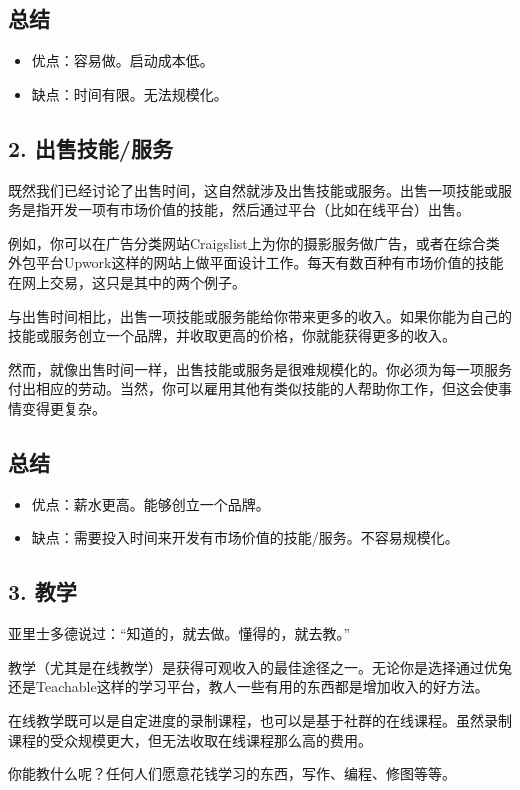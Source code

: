 \subsection{总结}
\begin{itemize}
\item 优点：容易做。启动成本低。
\item 缺点：时间有限。无法规模化。
\end{itemize}
\subsection{2. 出售技能/服务}
既然我们已经讨论了出售时间，这自然就涉及出售技能或服务。出售一项技能或服务是指开发一项有市场价值的技能，然后通过平台（比如在线平台）出售。

例如，你可以在广告分类网站Craigslist上为你的摄影服务做广告，或者在综合类外包平台Upwork这样的网站上做平面设计工作。每天有数百种有市场价值的技能在网上交易，这只是其中的两个例子。

与出售时间相比，出售一项技能或服务能给你带来更多的收入。如果你能为自己的技能或服务创立一个品牌，并收取更高的价格，你就能获得更多的收入。

然而，就像出售时间一样，出售技能或服务是很难规模化的。你必须为每一项服务付出相应的劳动。当然，你可以雇用其他有类似技能的人帮助你工作，但这会使事情变得更复杂。

\subsection{总结}
\begin{itemize}
\item 优点：薪水更高。能够创立一个品牌。
\item 缺点：需要投入时间来开发有市场价值的技能/服务。不容易规模化。
\end{itemize}
\subsection{3. 教学}
亚里士多德说过：“知道的，就去做。懂得的，就去教。”

教学（尤其是在线教学）是获得可观收入的最佳途径之一。无论你是选择通过优兔还是Teachable这样的学习平台，教人一些有用的东西都是增加收入的好方法。

在线教学既可以是自定进度的录制课程，也可以是基于社群的在线课程。虽然录制课程的受众规模更大，但无法收取在线课程那么高的费用。

你能教什么呢？任何人们愿意花钱学习的东西，写作、编程、修图等等。

